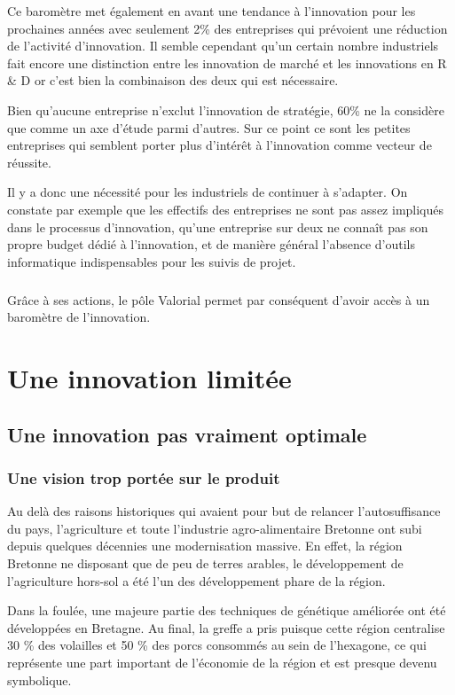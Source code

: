 \documentclass[a4paper,12pt]{report}
\begin{document}
    Ce baromètre met également en avant une tendance à l’innovation pour les prochaines années avec seulement 2\% des entreprises qui prévoient une réduction de l’activité d’innovation. Il semble cependant qu’un certain nombre industriels fait encore une distinction entre les innovation de marché et les innovations en R \& D or c’est bien la combinaison des deux qui est nécessaire.

    Bien qu’aucune entreprise n’exclut l’innovation de stratégie, 60\% ne la considère que comme un axe d’étude parmi d’autres. Sur ce point ce sont les petites entreprises qui semblent porter plus d’intérêt à l’innovation comme vecteur de réussite.

    Il y a donc une nécessité pour les industriels de continuer à s’adapter. On constate par exemple que les effectifs des entreprises ne sont pas assez impliqués dans le processus d’innovation, qu’une entreprise sur deux ne connaît pas son propre budget dédié à l’innovation, et de manière général l’absence d’outils informatique indispensables pour les suivis de projet.
    
    \paragraph{}Grâce à ses actions, le pôle Valorial permet par conséquent d'avoir accès à un baromètre de l'innovation.

\chapter{Une innovation limitée}

	\section{Une innovation pas vraiment optimale}
	
		\subsection{Une vision trop portée sur le produit}
			Au delà des raisons historiques qui avaient pour but de relancer l’autosuffisance du pays, l’agriculture et toute l’industrie agro-alimentaire Bretonne ont subi depuis quelques décennies une modernisation massive. En effet, la région Bretonne ne disposant que de peu de terres arables, le développement de l’agriculture hors-sol a été l’un des développement phare de la région. 
			
			Dans la foulée, une majeure partie des techniques de génétique améliorée ont été développées en Bretagne. Au final, la greffe a pris puisque cette région centralise 30 \% des volailles et 50 \% des porcs consommés au sein de l’hexagone, ce qui représente une part important de l’économie de la région et est presque devenu symbolique.
			
\end{document}
